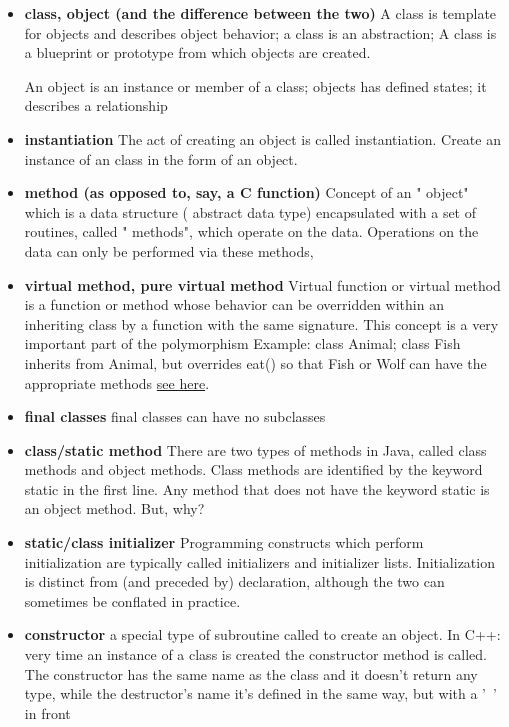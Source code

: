 \documentclass[letterpaper]{article}
\begin{document}
\begin{itemize}
\item {\bf class, object (and the difference between the two)}
  	A class is template for objects and describes object behavior; a class is
    an abstraction; A class is a blueprint or prototype from which objects 
    are created.

	An object is an instance or member of a class; objects has defined 
    states; it describes a relationship
  
\item {\bf instantiation
}	The act of creating an object is called instantiation.
	Create an instance of an class in the form of an object.

\item {\bf method (as opposed to, say, a C function)
}	Concept of an " object" which is a data structure ( abstract data type) 
	encapsulated with a set of routines, called " methods", which operate 
	on the data. Operations on the data can only be performed via these 
	methods,

\item {\bf virtual method, pure virtual method
}	Virtual function or virtual method is a function or method whose behavior 
	can be overridden within an inheriting class by a function with the same signature. This concept is a very important part of the polymorphism
	Example: class Animal; class Fish inherits from Animal, but overrides eat()
	so that Fish or Wolf can have the appropriate methods \href{http://en.wikipedia.org/wiki/Virtual_function}
	{see here}.

\item {\bf final classes}
	final classes can have no subclasses

\item {\bf class/static method
}	There are two types of methods in Java, called class methods and object methods. Class methods are identified by the keyword static in the first line. Any method that does not have the keyword static is an object method.
	But, why? 

\item {\bf static/class initializer
}	 Programming constructs which perform initialization are typically called 
	 initializers and initializer lists. Initialization is distinct from 
	 (and preceded by) declaration, although the two can sometimes be 
	 conflated in practice.


\item {\bf constructor
}	a special type of subroutine called to create an object.
	In C++: very time an instance of a class is created the constructor method is called. The constructor has the same name as the class and it doesn't return any type, while the destructor's name it's defined in the same way, but with a '~' in front


\end{itemize}
\end{document}

